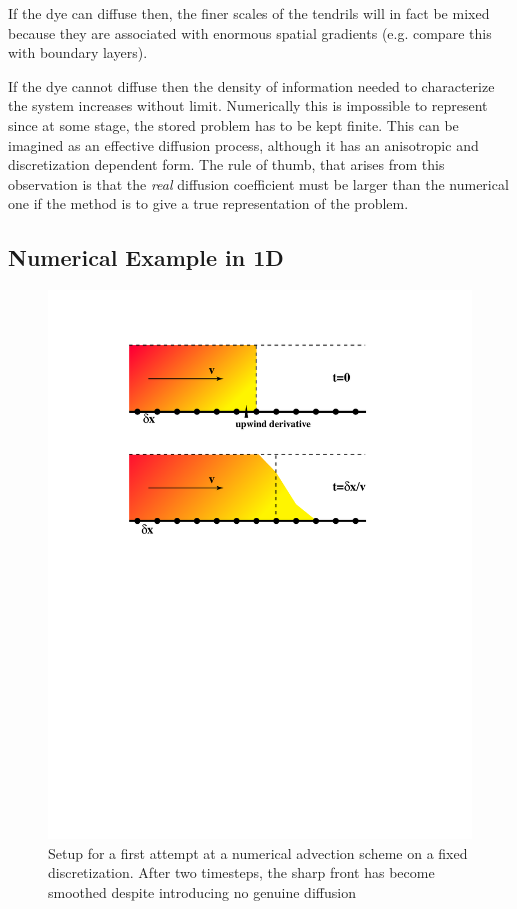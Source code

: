 \documentclass[10pt]{article}
\begin{document}
	If the dye can diffuse then, the finer scales of the tendrils will in fact be mixed
	because they are associated with enormous spatial gradients (e.g. compare this
	with boundary layers). 
	
	If the dye cannot diffuse then the density of information needed to characterize the 
	system increases without limit. Numerically this is impossible to represent since
	at some stage, the stored problem has to be kept finite.  This can be
	imagined as an effective diffusion process, although it has an anisotropic and
	discretization dependent form.  The rule of thumb, that arises from this observation
	is that the {\em real} diffusion coefficient must be larger than the numerical one
	if the method is to give a true representation of the problem. 
	
	\subsection{Numerical Example in 1D}
	
		\begin{figure}[h]           
			\begin{center}
	 			 \includegraphics[width=0.66\linewidth]{Diagrams/eul_adv.pdf}
	 			\caption[]{Setup for a first attempt at a numerical advection scheme on
	 				a fixed discretization. After two timesteps, the sharp front has become
	 				smoothed despite introducing no genuine diffusion}
	 			\label{fig:adv2}
	 		\end{center}
		\end{figure}
		
\end{document}
